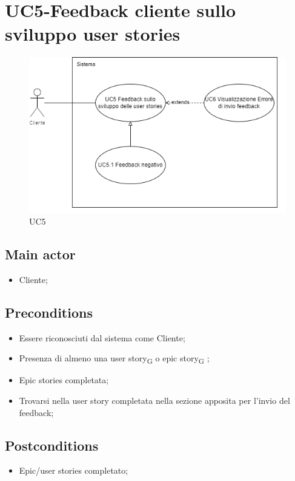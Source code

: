 \documentclass{article}
\begin{document}
\section{UC5-Feedback cliente sullo sviluppo user stories}
    \begin{figure}[h]
      \centering
      \includegraphics{./imgUML/UC5.png}
        \caption{UC5}
      \label{fig:UC5}
    \end{figure}
    
    \subsection*{Main actor}
    \begin{itemize}
        \item Cliente;
    \end{itemize}
    
    \subsection*{Preconditions}
    \begin{itemize}
        \item Essere riconosciuti dal sistema come Cliente;
        \item Presenza di almeno una user story\textsubscript{G}  o epic story\textsubscript{G} ;
        \item Epic stories completata;
        \item Trovarsi nella user story completata nella sezione apposita per l'invio del feedback;
    \end{itemize}
    
    \subsection*{Postconditions}
    \begin{itemize}
        \item Epic/user stories completato;
    \end{itemize}
    
\end{document}
